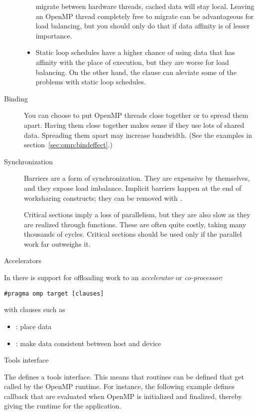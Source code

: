 \begin{description}
\begin{itemize}
    migrate between hardware threads, cached data will stay local.
    Leaving an OpenMP thread completely free to migrate can be
    advantageous for load balancing, but you should only do that if
    data affinity is of lesser importance.
  \item Static loop schedules have a higher chance of using data that
    has affinity with the place of execution, but they are worse for
    load balancing. On the other hand, the  clause
    can aleviate some of the problems with static loop schedules.
  \end{itemize}
\item[Binding] You can choose to put OpenMP threads close together or
  to spread them apart. Having them close together makes sense if they
  use lots of shared data. Spreading them apart may increase
  bandwidth. (See the examples in section~\ref{sec:omp:bindeffect}.)
\item[Synchronization] Barriers are a form of synchronization. They
  are expensive by themselves, and they expose load
  imbalance. Implicit barriers happen at the end of worksharing
  constructs; they can be removed with .

  Critical sections imply a loss of parallelism, but they are also
  slow as they are realized through 
  functions. These are often quite costly, taking many thousands of
  cycles.  Critical sections should be used only if the parallel work
  far outweighs it.
\end{description}

 {Accelerators}

In  there is support for offloading work to an
\emph{accelerator}
or
\emph{co-processor}:
\begin{lstlisting}
#pragma omp target [clauses]
\end{lstlisting}
with clauses such as
\begin{itemize}
\item {}: place data
\item {}: make data consistent between host and device
\end{itemize}

 {Tools interface}

The  defines a tools interface.
This means that routines can be defined that get called by the OpenMP runtime.
For instance, the following example defines callback that are evaluated
when OpenMP is initialized and finalized, thereby giving the
runtime for the application.

